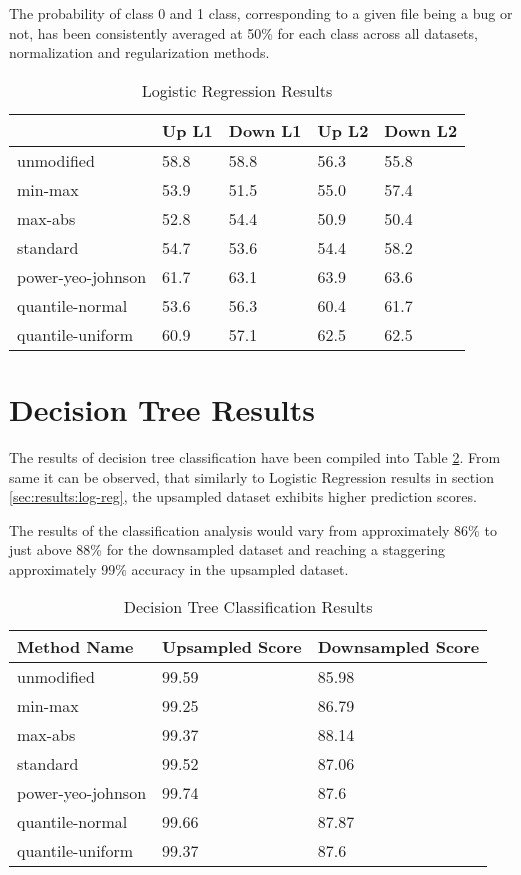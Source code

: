The probability of class 0 and 1 class, corresponding to a given file being a bug or not, has been consistently averaged at 50\% for each class across all datasets, normalization and regularization methods. 
\begin{table}[h!]
\centering
\caption{Logistic Regression Results}
\label{tbl:results:log-reg}
\begin{tabular}{@{}lllll@{}}
\toprule
 & Up L1 & Down L1 & Up L2 & Down L2 \\ \midrule
unmodified & 58.8 & 58.8 & 56.3 & 55.8 \\
min-max & 53.9 & 51.5 & 55.0 & 57.4 \\
max-abs & 52.8 & 54.4 & 50.9 & 50.4 \\
standard & 54.7 & 53.6 & 54.4 & 58.2 \\
power-yeo-johnson & 61.7 & 63.1 & 63.9 & 63.6 \\
quantile-normal & 53.6 & 56.3 & 60.4 & 61.7 \\
quantile-uniform & 60.9 & 57.1 & 62.5 & 62.5 \\ \bottomrule
\end{tabular}
\end{table}

\section{Decision Tree Results}\label{sec:results:decision-tree}
The results of decision tree classification have been compiled into Table \ref{tbl:results:decision-tree}. From same it can be observed, that similarly to Logistic Regression results in section \ref{sec:results:log-reg}, the upsampled dataset exhibits higher prediction scores. 

The results of the classification analysis would vary from approximately 86\% to just above 88\% for the downsampled dataset and reaching a staggering approximately 99\% accuracy in the upsampled dataset.
\begin{table}[h!]
\centering
\caption{Decision Tree Classification Results}
\label{tbl:results:decision-tree}
\begin{tabular}{@{}lll@{}}
\toprule
Method Name & Upsampled Score & Downsampled Score \\ \midrule
unmodified & 99.59 & 85.98 \\
min-max & 99.25 & 86.79 \\
max-abs & 99.37 & 88.14 \\
standard & 99.52 & 87.06 \\
power-yeo-johnson & 99.74 & 87.6 \\
quantile-normal & 99.66 & 87.87 \\
quantile-uniform & 99.37 & 87.6 \\ \bottomrule
\end{tabular}
\end{table}

